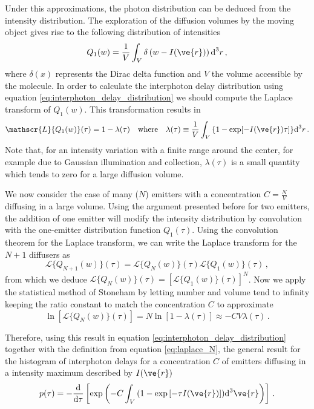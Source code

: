 Under this approximations, the photon distribution can be deduced from the 
intensity distribution. The exploration of the diffusion volumes by the moving 
object gives rise to the following distribution of intensities 
\begin{equation}
Q_1(w)=\frac{1}{V}\int_V{\delta\left( w-I(\ve{r})\right)\mbox{d}^3r} \,,
\label{eq:intesity1}
\end{equation} 
where $\delta(x)$ represents the Dirac delta function and $V$ the volume 
accessible by the molecule. In order to calculate the interphoton delay 
distribution using equation \ref{eq:interphoton_delay_distribution} we should 
compute the Laplace transform of $Q_1(w)$. This transformation results in 
\begin{equation}
\mathscr{L}\{Q_1(w)\}(\tau) = 1 -\lambda(\tau) \quad \mbox{where} \quad 
\lambda(\tau)\equiv \frac{1}{V}\int_V{ \{1-\exp[-I(\ve{r})\tau]\}\mbox{d}^3r} \, .
\label{eq:one-emitter}
\end{equation} 
Note that, for an intensity variation with a finite range around the center, 
for example due to Gaussian illumination and collection, $\lambda(\tau)$ is a 
small quantity which tends to zero for a large diffusion volume.  

We now consider the case of many ($N$) emitters with a concentration $C=\frac{N}{V}$
 diffusing in a large volume. Using the argument presented before for two emitters, 
the addition of one emitter will modify the intensity distribution by convolution 
with the one-emitter distribution function $Q_1(\tau)$. Using the convolution theorem 
for the Laplace transform, we can write the Laplace transform for the $N+1$ diffusers as
\begin{equation}
\mathscr{L}\{Q_{N+1}(w)\}(\tau) = \mathscr{L}\{Q_N(w)\}(\tau) \mathscr{L}\{Q_1(w)\}(\tau)\,,
\label{eq:laplace_N}
\end{equation}
from which we deduce 
$\mathscr{L}\{Q_{N}(w)\}(\tau)=\left[\mathscr{L}\{Q_{1}(w)\}(\tau)\right]^N $. 
Now we apply the statistical method of Stoneham \cite{stoneham1969, Fleury1995} 
by letting number and volume tend to infinity keeping the ratio constant to match 
the concentration $C$ to approximate
\begin{equation}
\ln\left[\mathscr{L}\{Q_{N}(w)\}(\tau)\right] = 
N\ln\left[1-\lambda(\tau)\right] \approx - C V \lambda(\tau)\,.
\label{eq:stoneham_approx}
\end{equation}

Therefore, using this result in equation \ref{eq:interphoton_delay_distribution} 
together with the definition from equation \ref{eq:laplace_N}, the general result 
for the histogram of interphoton delays for a concentration $C$ of emitters diffusing 
in a intensity maximum described by $I(\ve{r})$ 
\begin{equation}
p(\tau)=-\frac{\mbox{d}}{\mbox{d}\tau}\left[ 
\exp\left(-C \int_V{\left(1-\exp\left[-\tau I(\ve{r})\right] \right)}
\mbox{d}^3\ve{r}    \right)\right]\,.
\label{eq:result}
\end{equation}

